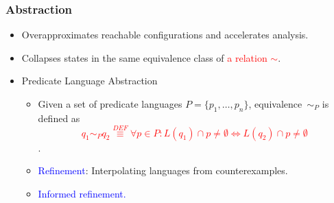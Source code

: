 \documentclass{beamer}
\newcommand{\hlbl}[1]{\textcolor{blue}{#1}}
\newcommand{\hlgr}[1]{\textcolor{olive!50!green}{#1}}
\newcommand{\hlrd}[1]{\textcolor{red}{#1}}
\begin{document}
\begin{frame}
\frametitle{Abstraction}

	\begin{itemize}
		\item Overapproximates reachable configurations and accelerates analysis.
		\item Collapses states in the same equivalence class of \hlrd{a relation $\sim$}.

	    \item \hlgr{Predicate Language Abstraction}
		\begin{itemize}
			\item Given a set of predicate languages $P=\{p_1,\ldots,p_n\}$,
				equivalence~$\sim_P$ is defined as
				\hlrd{$$q_1 \sim_P q_2 \stackrel{DEF}{\equiv} \forall p\in P: L(q_1) \cap p \neq \emptyset \Leftrightarrow L(q_2) \cap p \neq \emptyset$$}.
			\item \hlbl{Refinement}: Interpolating languages from counterexamples.
			\item \hlbl{Informed refinement.} 
		\end{itemize}
	\end{itemize}


\end{frame}

\end{document}

